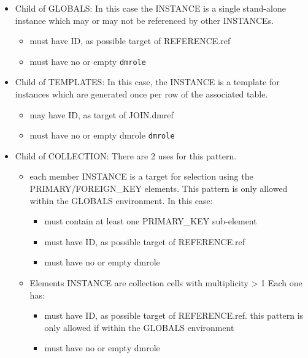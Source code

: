 \begin{itemize}
\item Child of GLOBALS:
   In this case the INSTANCE is a single stand-alone instance which
   may or may not be referenced by other INSTANCEs.
  \begin{itemize}
     \item must have ID, as possible target of REFERENCE.ref
     \item must have no or empty \texttt{dmrole}
  \end{itemize}  
  
\item Child of TEMPLATES:
  In this case, the INSTANCE is a template for instances which
  are generated once per row of the associated table.  
  \begin{itemize}
     \item may have ID, as target of JOIN.dmref
     \item must have no or empty dmrole \texttt{dmrole}
  \end{itemize}  
  
\item Child of COLLECTION:
  There are 2 uses for this pattern.  
  \begin{itemize}
     \item each member INSTANCE is a target for selection using
           the PRIMARY/FOREIGN\_KEY elements. This pattern is only 
           allowed within the GLOBALS environment. In this case:             
           \begin{itemize}
             \item must contain at least one PRIMARY\_KEY sub-element
             \item must have ID, as possible target of REFERENCE.ref
             \item must have no or empty dmrole
           \end{itemize}

     \item Elements INSTANCE are collection cells with multiplicity > 1
          Each one has:             
           \begin{itemize}
             \item must have ID, as possible target of REFERENCE.ref. 
                   this pattern is             
                   only allowed if within the GLOBALS environment
             \item must have no or empty dmrole
           \end{itemize}
    

\end{itemize}
\end{itemize}
